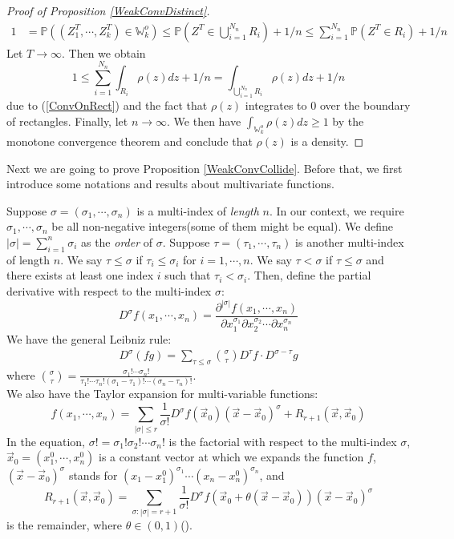\begin{proof}[Proof of Proposition \ref{WeakConvDistinct}]
\begin{align*}
	1&=\mathbb{P}((Z_{1}^{T},\cdots,Z_{k}^{T})\in \mathbb{W}_{k}^{o})\leq \mathbb{P}(Z^{T}\in\bigcup_{i=1}^{N_{n}}R_{i})+1/n \leq \sum_{i=1}^{N_{n}}\mathbb{P}(Z^{T}\in R_{i})+1/n
\end{align*}
Let $T\rightarrow\infty$. Then we obtain
$$1\leq \sum_{i=1}^{N_{n}}\int_{R_{i}}\rho(z)dz+1/n=\int_{\bigcup_{i=1}^{N_{n}}R_{i}}\rho(z)dz+1/n$$
due to (\ref{ConvOnRect}) and the fact that $\rho(z)$ integrates to $0$ over the boundary of rectangles. Finally, let $n\rightarrow\infty$. We then have $\int_{\mathbb{W}_{k}^{o}}\rho(z)dz\geq 1$ by the monotone convergence theorem and conclude that $\rho(z)$ is a density.
\end{proof}

Next we are going to prove Proposition \ref{WeakConvCollide}. Before that, we first introduce some notations and results about multivariate functions.

Suppose $\sigma = (\sigma_{1},\cdots,\sigma_{n})$ is a multi-index of \emph{length} $n$. In our context, we require $\sigma_{1},\cdots,\sigma_{n}$ be all non-negative integers(some of them might be equal). We define $|\sigma|=\sum_{i=1}^{n}\sigma_{i}$ as the \emph{order} of $\sigma$. Suppose $\tau=(\tau_{1},\cdots,\tau_{n})$ is another multi-index of length $n$. We say $\tau\leqslant \sigma$ if $\tau_{i}\leqslant \sigma_{i}$ for $i=1,\cdots,n$. We say $\tau<\sigma$ if $\tau\leqslant \sigma$ and there exists at least one index $i$ such that $\tau_{i}<\sigma_{i}$. Then, define the partial derivative with respect to the multi-index $\sigma$:
$$D^{\sigma}f(x_{1},\cdots,x_{n})=\frac{\partial^{|\sigma|}f(x_{1},\cdots,x_{n})}{\partial x_{1}^{\sigma_{1}}\partial x_{2}^{\sigma_{2}}\cdots \partial x_{n}^{\sigma_{n}}}$$ We have the general Leibniz rule:
\begin{align*}
	D^{\sigma}(fg)=\sum_{\tau\leqslant\sigma}\binom{\sigma}{\tau}D^{\tau}f\cdot D^{\sigma-\tau}g
\end{align*}
where $\binom{\sigma}{\tau}=\frac{\sigma_{1}!\cdots\sigma_{n}!}{\tau_{1}!\cdots\tau_{n}!(\sigma_{1}-\tau_{1})!\cdots(\sigma_{n}-\tau_{n})!}$.\\
We also have the Taylor expansion for multi-variable functions:
$$f(x_{1},\cdots,x_{n})=\sum_{|\sigma|\leqslant r}\frac{1}{\sigma!}D^{\sigma}f(\vec{x}_{0})(\vec{x}-\vec{x}_{0})^{\sigma}+R_{r+1}(\vec{x},\vec{x}_{0})$$ 
In the equation, $\sigma!=\sigma_{1}!\sigma_{2}!\cdots\sigma_{n}!$ is the factorial with respect to the multi-index $\sigma$, $\vec{x}_{0}=(x_{1}^{0},\cdots,x_{n}^{0})$ is a constant vector at which we expands the function $f$, $(\vec{x}-\vec{x}_{0})^{\sigma}$ stands for $(x_{1}-x_{1}^{0})^{\sigma_{1}}\cdots(x_{n}-x_{n}^{0})^{\sigma_{n}}$, and $$R_{r+1}(\vec{x},\vec{x}_{0})=\sum_{\sigma:|\sigma|=r+1}\frac{1}{\sigma!}D^{\sigma}f(\vec{x}_{0}+\theta(\vec{x}-\vec{x}_{0}))(\vec{x}-\vec{x}_{0})^{\sigma}$$ is the remainder, where $\theta\in (0,1)$(\cite[Theorem 3.18 \& Corollary 3.19]{CJ}).

